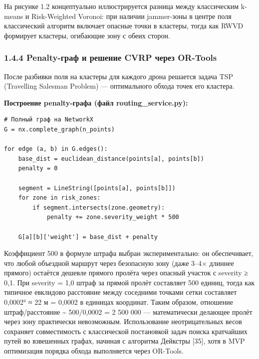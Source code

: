 На рисунке 1.2 концептуально иллюстрируется разница между классическим k-means и Risk-Weighted Voronoi: при наличии jammer-зоны в центре поля классический алгоритм включает опасные точки в кластеры, тогда как RWVD формирует кластеры, огибающие зону с обеих сторон.

\hypertarget{penalty-ux433ux440ux430ux444-ux438-ux440ux435ux448ux435ux43dux438ux435-cvrp-ux447ux435ux440ux435ux437-or-tools}{%
\subsubsection{1.4.4 Penalty-граф и решение CVRP через OR-Tools}\label{penalty-ux433ux440ux430ux444-ux438-ux440ux435ux448ux435ux43dux438ux435-cvrp-ux447ux435ux440ux435ux437-or-tools}}

После разбивки поля на кластеры для каждого дрона решается задача TSP (Travelling Salesman Problem) --- оптимального обхода точек его кластера.

\textbf{Построение penalty-графа (файл routing\_service.py):}

\begin{verbatim}
# Полный граф на NetworkX
G = nx.complete_graph(n_points)

for edge (a, b) in G.edges():
    base_dist = euclidean_distance(points[a], points[b])
    penalty = 0
    
    segment = LineString([points[a], points[b]])
    for zone in risk_zones:
        if segment.intersects(zone.geometry):
            penalty += zone.severity_weight * 500
    
    G[a][b]['weight'] = base_dist + penalty
\end{verbatim}

Коэффициент 500 в формуле штрафа выбран экспериментально: он обеспечивает, что любой объездной маршрут через безопасную зону (даже 3--4× длиннее прямого) остаётся дешевле прямого пролёта через опасный участок с severity ≥ 0,1. При severity = 1,0 штраф за прямой пролёт составляет 500 единиц, тогда как типичное евклидово расстояние между соседними точками сетки составляет 0,0002° ≈ 22 м = 0,0002 в единицах координат. Таким образом, отношение штраф/расстояние \textasciitilde{} 500/0,0002 = 2 500 000 --- математически делающее пролёт через зону практически невозможным. Использование неотрицательных весов сохраняет совместимость с классической постановкой задач поиска кратчайших путей во взвешенных графах, начиная с алгоритма Дейкстры {[}35{]}, хотя в MVP оптимизация порядка обхода выполняется через OR-Tools.

